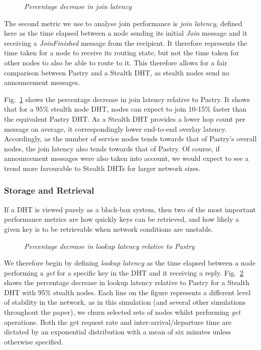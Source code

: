 \documentclass[letterpaper]{sig-alternate} %
\begin{document}
\begin{figure}[tb] \centering {} \caption{\em Percentage decrease in join latency}
\label{fig:joinlatency}
\end{figure}

The second metric we use to analyse join performance is \emph{join
latency}, defined here as the time elapsed between a node sending its
initial \emph{Join} message and it receiving a \emph{JoinFinished}
message from the recipient. It therefore represents the time taken for
a node to receive its routing state, but not the time taken for
other nodes to also be able to route to it. This therefore allows for a
fair comparison between Pastry and a Stealth DHT, as stealth nodes
send no announcement messages.

Fig.~\ref{fig:joinlatency} shows the percentage decrease in join
latency relative to Pastry. It shows that for a 95\% stealth node
DHT, nodes can expect to join 10-15\% faster than the equivalent
Pastry DHT. As a Stealth DHT provides a lower hop count per message
on average, it correspondingly lower end-to-end overlay latency.
Accordingly, as the number of service nodes tends towards that of
Pastry's overall nodes, the join latency also tends towards that of
Pastry. Of course, if announcement messages were also taken into
account, we would expect to see a trend more favourable to Stealth
DHTs for larger network sizes.

\subsubsection{Storage and Retrieval}
\label{subsubsect-storage}

If a DHT is viewed purely as a black-box system, then two of the most important
performance metrics are how quickly keys can be retrieved, and how likely a
given key is to be retrievable when network conditions are unstable.

\begin{figure}[tb]
\centering {}
\caption{\em Percentage decrease in lookup latency relative to Pastry}
\label{fig:lookuplatency}
\end{figure}

We therefore begin by defining \emph{lookup latency} as the time
elapsed between a node performing a \emph{get} for a specific key in
the DHT and it receiving a reply. Fig.~\ref{fig:lookuplatency} shows
the percentage decrease in lookup latency relative to Pastry for a
Stealth DHT with 95\% stealth nodes. Each line on the figure
represents a different level of stability in the network, as in this
simulation (and several other simulations throughout the paper), we
churn selected sets of nodes whilst performing \emph{get}
operations. Both the get request rate and inter-arrival/departure
time are dictated by an exponential distribution with a mean of six
minutes unless otherwise specified.
\end{document}
